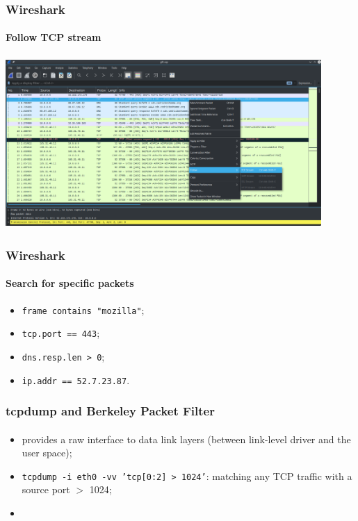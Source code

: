 \documentclass[]{beamer}
\begin{document}
\begin{frame}
\frametitle{Wireshark}
\framesubtitle{Follow TCP stream}
\begin{center}
    \includegraphics[height=6.5cm, width=12.0cm]{./images/Wireshark_follow_tcp_stream.png}
\end{center}
\end{frame}

\begin{frame}
\frametitle{Wireshark}
\framesubtitle{Search for specific packets}
\begin{itemize}
    \item \texttt{frame contains "mozilla"};
    \item \texttt{tcp.port == 443};
    \item \texttt{dns.resp.len > 0};
    \item \texttt{ip.addr == 52.7.23.87}.
\end{itemize}
\end{frame}

\begin{frame}
\frametitle{tcpdump and Berkeley Packet Filter}
\framesubtitle{}
\begin{itemize}
    \item provides a raw interface to data link layers (between link-level driver and the user space);
    \item \texttt{tcpdump -i eth0 -vv 'tcp[0:2] > 1024'}: matching any TCP traffic with a source port $>$ 1024;
    \item 
\end{itemize}
\end{frame}
\end{document}
